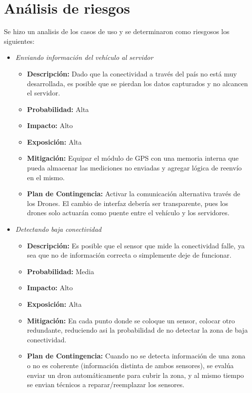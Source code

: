 \section{Análisis de riesgos}

Se hizo un analisis de los casos de uso y se determinaron como riesgosos los siguientes:


\begin{itemize}

\item \textit{Enviando información del vehículo al servidor}
\begin{itemize}
\item \textbf{Descripción:} Dado que la conectividad a través del país no está muy desarrollada, es posible que se pierdan los datos capturados y no alcancen el servidor.
\item \textbf{Probabilidad:} Alta
\item \textbf{Impacto:} Alto
\item \textbf{Exposición:} Alta
\item \textbf{Mitigación:} Equipar el módulo de GPS con una memoria interna que pueda almacenar las mediciones no enviadas y agregar lógica de reenvío en el mismo.
\item \textbf{Plan de Contingencia:} Activar la comunicación alternativa través de los Drones. El cambio de interfaz debería ser transparente, pues los drones solo actuarán como puente entre el vehículo y los servidores.
\end{itemize}

\end{itemize}



\begin{itemize}

\item \textit{Detectando baja conectividad}
\begin{itemize}
\item \textbf{Descripción:} Es posible que el sensor que mide la conectividad falle, ya sea que no de información correcta o simplemente deje de funcionar.
\item \textbf{Probabilidad:} Media
\item \textbf{Impacto:} Alto
\item \textbf{Exposición:} Alta
\item \textbf{Mitigación:} En cada punto donde se coloque un sensor, colocar otro redundante, reduciendo asi la probabilidad de no detectar la zona de baja conectividad.
\item \textbf{Plan de Contingencia:} Cuando no se detecta información de una zona o no es coherente (información distinta de ambos sensores), se evalúa enviar un dron automáticamente para cubrir la zona, y al mismo tiempo se envian técnicos a reparar/reemplazar los sensores.
\end{itemize}

\end{itemize}


